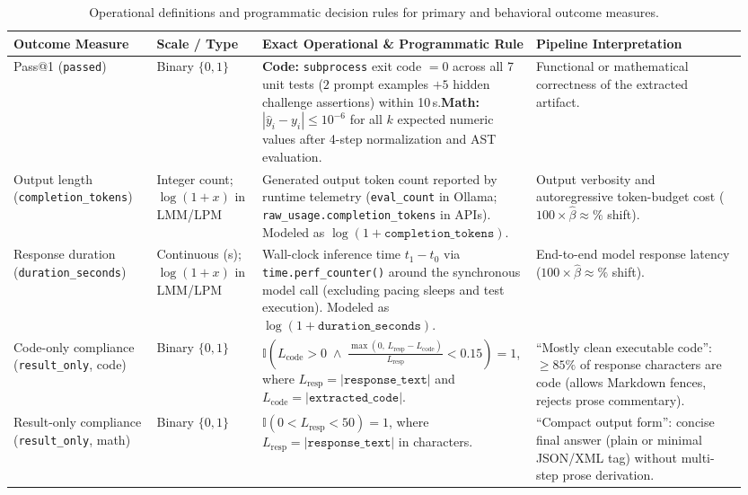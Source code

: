 \documentclass[a4paper,fleqn]{cas-sc}
\begin{document}
\begin{table}[htbp]
\centering
\caption{Operational definitions and programmatic decision rules for primary and behavioral outcome measures.}\label{tab:outcome-operationalization}
\footnotesize
\setlength{\tabcolsep}{4pt}
\begin{tabular}{@{}p{0.19\linewidth}p{0.14\linewidth}p{0.34\linewidth}p{0.28\linewidth}@{}}
\toprule
\textbf{Outcome Measure} & \textbf{Scale / Type} & \textbf{Exact Operational \& Programmatic Rule} & \textbf{Pipeline Interpretation} \\
\midrule
Pass@1 (\texttt{passed}) & Binary $\{0, 1\}$ & \textbf{Code:} \texttt{subprocess} exit code $= 0$ across all 7 unit tests ($2$ prompt examples $+ 5$ hidden challenge assertions) within 10\,s.\newline \textbf{Math:} $|\hat{y}_i - y_i| \le 10^{-6}$ for all $k$ expected numeric values after 4-step normalization and AST evaluation. & Functional or mathematical correctness of the extracted artifact. \\
\addlinespace[3pt]
Output length (\texttt{completion\_tokens}) & Integer count; $\log(1 + x)$ in LMM/LPM & Generated output token count reported by runtime telemetry (\texttt{eval\_count} in Ollama; \texttt{raw\_usage.completion\_tokens} in APIs). Modeled as $\log(1 + \texttt{completion\_tokens})$. & Output verbosity and autoregressive token-budget cost ($100 \times \hat{\beta} \approx \%$ shift). \\
\addlinespace[3pt]
Response duration (\texttt{duration\_seconds}) & Continuous (s); $\log(1 + x)$ in LMM/LPM & Wall-clock inference time $t_1 - t_0$ via \texttt{time.perf\_counter()} around the synchronous model call (excluding pacing sleeps and test execution). Modeled as $\log(1 + \texttt{duration\_seconds})$. & End-to-end model response latency ($100 \times \hat{\beta} \approx \%$ shift). \\
\addlinespace[3pt]
Code-only compliance (\texttt{result\_only}, code) & Binary $\{0, 1\}$ & $\mathbb{I}\!\left(L_{\text{code}} > 0 \;\wedge\; \frac{\max(0,\, L_{\text{resp}} - L_{\text{code}})}{L_{\text{resp}}} < 0.15\right) = 1$, where $L_{\text{resp}} = |\texttt{response\_text}|$ and $L_{\text{code}} = |\texttt{extracted\_code}|$. & ``Mostly clean executable code'': $\ge 85\%$ of response characters are code (allows Markdown fences, rejects prose commentary). \\
\addlinespace[3pt]
Result-only compliance (\texttt{result\_only}, math) & Binary $\{0, 1\}$ & $\mathbb{I}\!\left(0 < L_{\text{resp}} < 50\right) = 1$, where $L_{\text{resp}} = |\texttt{response\_text}|$ in characters. & ``Compact output form'': concise final answer (plain or minimal JSON/XML tag) without multi-step prose derivation. \\

\end{tabular}
\end{table}
\end{document}

